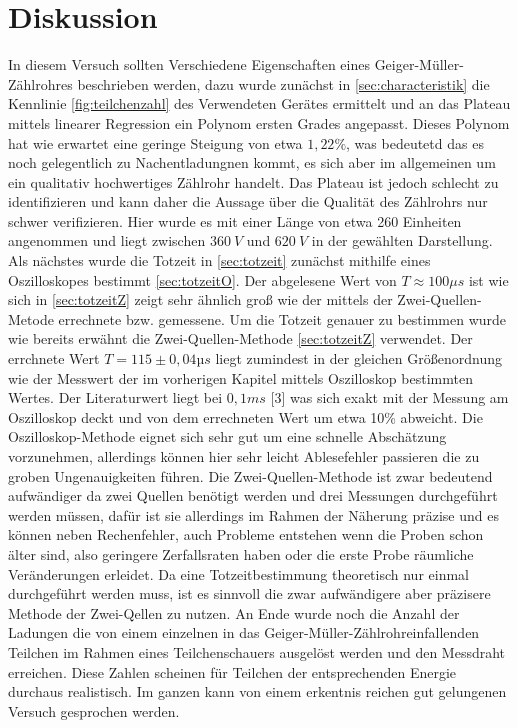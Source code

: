 \section{Diskussion}
\label{sec:diskussion}
In diesem Versuch sollten Verschiedene Eigenschaften eines Geiger-Müller-Zählrohres beschrieben werden, dazu 
wurde zunächst in \autoref{sec:characteristik} die Kennlinie \autoref{fig:teilchenzahl} 
des Verwendeten Gerätes ermittelt und an das Plateau mittels linearer Regression ein Polynom ersten Grades 
angepasst. Dieses Polynom hat wie erwartet eine geringe Steigung von etwa $1,22\%$, was bedeutetd das es noch 
gelegentlich zu Nachentladungnen kommt, es sich aber im allgemeinen um ein qualitativ hochwertiges Zählrohr handelt.
Das Plateau ist jedoch schlecht zu identifizieren und kann daher die Aussage über die Qualität des Zählrohrs nur  schwer
verifizieren. Hier wurde es mit einer Länge von etwa 260 Einheiten angenommen und liegt 
zwischen $\SI{360}{V}$ und $\SI{620}{V}$ in der gewählten Darstellung. Als nächstes wurde die Totzeit in 
\autoref{sec:totzeit} zunächst mithilfe eines Oszilloskopes bestimmt \autoref{sec:totzeitO}. 
Der abgelesene Wert von $T\approx 100\mu s$ ist wie sich in \autoref{sec:totzeitZ} zeigt sehr ähnlich groß wie
der mittels der Zwei-Quellen-Metode errechnete bzw. gemessene. Um die Totzeit genauer zu bestimmen wurde wie 
bereits erwähnt die Zwei-Quellen-Methode \autoref{sec:totzeitZ} verwendet. Der errchnete Wert $T=115\pm0,04µs$
liegt zumindest in der gleichen Größenordnung wie der Messwert der im vorherigen Kapitel mittels Oszilloskop 
bestimmten Wertes. Der Literaturwert liegt bei $0,1ms$ [3] was sich exakt mit der Messung am Oszilloskop deckt und
von dem errechneten Wert um etwa 10\% abweicht. Die Oszilloskop-Methode eignet sich sehr gut um eine schnelle 
Abschätzung vorzunehmen, allerdings können hier sehr leicht Ablesefehler passieren die zu groben Ungenauigkeiten
führen. Die Zwei-Quellen-Methode ist zwar bedeutend aufwändiger da zwei Quellen benötigt werden und drei Messungen 
durchgeführt werden müssen, dafür ist sie allerdings im Rahmen der Näherung präzise und es können neben Rechenfehler, 
auch Probleme entstehen wenn die Proben schon älter sind, also geringere Zerfallsraten haben oder die erste Probe 
räumliche Veränderungen erleidet. Da eine Totzeitbestimmung theoretisch nur einmal durchgeführt werden muss, ist es sinnvoll die zwar 
aufwändigere aber präzisere Methode der Zwei-Qellen zu nutzen.  An Ende wurde noch die Anzahl der Ladungen die 
von einem einzelnen in das Geiger-Müller-Zählrohreinfallenden Teilchen im Rahmen eines Teilchenschauers 
ausgelöst werden und den Messdraht erreichen. Diese Zahlen scheinen für Teilchen der entsprechenden Energie 
durchaus realistisch. Im ganzen kann von einem erkentnis reichen gut gelungenen Versuch gesprochen werden.

